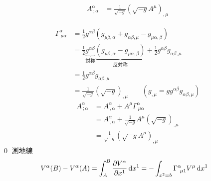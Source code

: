 \documentclass[uplatex,dvipdfmx,a4paper,11pt]{jlreq}
\makeatletter
\theoremstyle{definition}
\renewenvironment{proof}[1][\proofname]{\par
  \normalfont
  \topsep6\p@\@plus6\p@ \trivlist
  \item[\hskip\labelsep{\bfseries #1}\@addpunct{\bfseries}]\ignorespaces\quad\par
}{%
  \qed\endtrivlist\@endpefalse
}
\renewcommand\proofname{証明}
\makeatother
\begin{document}
\begin{theorem}[発散の公式]
  \begin{align}
    A^\alpha_{\ ;\alpha} & = \frac{1}{\sqrt{-g}}(\sqrt{-g}A^\mu)_{,\mu}
  \end{align}
\end{theorem}
\begin{proof}
  \begin{align}
    \Gamma^\alpha_{\ \mu\alpha} & = \frac{1}{2}g^{\alpha\beta}(g_{\mu\beta,\alpha} + g_{\alpha\beta,\mu} - g_{\mu\alpha,\beta})                                                                \\
                                & = \frac{1}{2}\underbrace{g^{\alpha\beta}}_{対称}\underbrace{(g_{\mu\beta,\alpha} - g_{\mu\alpha,\beta})}_{反対称} + \frac{1}{2}g^{\alpha\beta}g_{\alpha\beta,\mu} \\
                                & = \frac{1}{2}g^{\alpha\beta}g_{\alpha\beta,\mu}                                                                                                              \\
                                & = \frac{1}{\sqrt{-g}}(\sqrt{-g})_{,\mu} \qquad (g_{,\mu} = gg^{\alpha\beta}g_{\alpha\beta,\mu})
  \end{align}
  \begin{align}
    A^\alpha_{\ ;\alpha} & = A^\alpha_{\ ,\alpha} + A^\mu\Gamma^\alpha_{\ \mu\alpha}           \\
                         & = A^\alpha_{\ ,\alpha} + \frac{1}{\sqrt{-g}}A^\mu(\sqrt{-g})_{,\mu} \\
                         & = \frac{1}{\sqrt{-g}}(\sqrt{-g}A^\mu)_{,\mu}
  \end{align}
\end{proof}
測地線
\begin{align}
  V^\alpha(B) - V^\alpha(A) & = \int_A^B\diffp{V^\alpha}{x^1}\dl{x^1} = -\int_{x^2 = b}\Gamma^\alpha_{\ \mu 1}V^\mu\dl{x^1}
\end{align}
\end{document}
